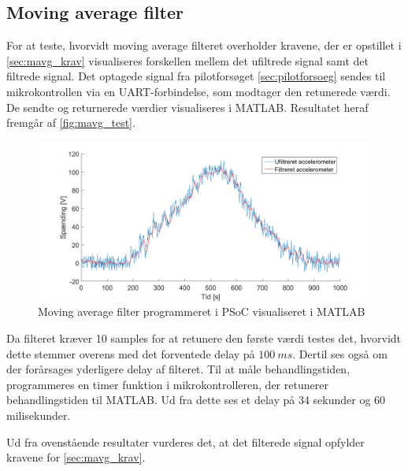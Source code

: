 \subsection{Moving average filter}
For at teste, hvorvidt moving average filteret overholder kravene, der er opstillet i \autoref{sec:mavg_krav} visualiseres forskellen mellem det ufiltrede signal samt det filtrede signal. Det optagede signal fra pilotforsøget \autoref{sec:pilotforsoeg} sendes til mikrokontrollen via en UART-forbindelse, som modtager den retunerede værdi. De sendte og returnerede værdier visualiseres i MATLAB. Resultatet heraf fremgår af \autoref{fig:mavg_test}. 

\begin{figure}[H]
	\centering
	\includegraphics[width=1\textwidth]{figures/accelerometer_filter}
	\caption{Moving average filter programmeret i PSoC visualiseret i MATLAB}
	\label{fig:mavg_test}
\end{figure}


Da filteret kræver 10 samples for at retunere den første værdi testes det, hvorvidt dette stemmer overens med det forventede delay på $100~ms$. Dertil ses også om der forårsages yderligere delay af filteret. Til at måle behandlingstiden, programmeres en timer funktion i mikrokontrolleren, der retunerer behandlingstiden til MATLAB. Ud fra dette ses et delay på 34 sekunder og 60 milisekunder.

Ud fra ovenstående resultater vurderes det, at det filterede signal opfylder kravene for \autoref{sec:mavg_krav}. 